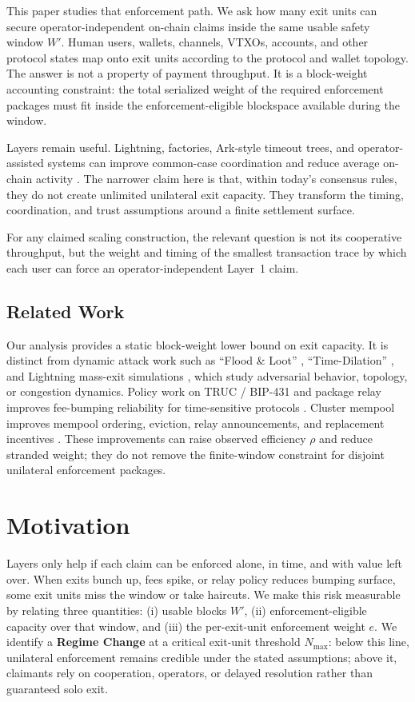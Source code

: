 \documentclass{article}
\theoremstyle{definition}
\begin{document}
This paper studies that enforcement path. We ask how many exit units can secure operator-independent on-chain claims inside the same usable safety window $W'$. Human users, wallets, channels, VTXOs, accounts, and other protocol states map onto exit units according to the protocol and wallet topology. The answer is not a property of payment throughput. It is a block-weight accounting constraint: the total serialized weight of the required enforcement packages must fit inside the enforcement-eligible blockspace available during the window.

Layers remain useful. Lightning, factories, Ark-style timeout trees, and operator-assisted systems can improve common-case coordination and reduce average on-chain activity \cite{factory,ark}. The narrower claim here is that, within today's consensus rules, they do not create unlimited unilateral exit capacity. They transform the timing, coordination, and trust assumptions around a finite settlement surface.

For any claimed scaling construction, the relevant question is not its cooperative throughput, but the weight and timing of the smallest transaction trace by which each user can force an operator-independent Layer~1 claim.

\subsection*{Related Work}
Our analysis provides a static block-weight lower bound on exit capacity. It is distinct from dynamic attack work such as ``Flood \& Loot'' \cite{harrisZohar}, ``Time-Dilation'' \cite{riardNaumenko}, and Lightning mass-exit simulations \cite{sguanci2022}, which study adversarial behavior, topology, or congestion dynamics. Policy work on TRUC / BIP-431 and package relay improves fee-bumping reliability for time-sensitive protocols \cite{bip431,core28,core31,packagepolicy}. Cluster mempool improves mempool ordering, eviction, relay announcements, and replacement incentives \cite{clusterMempool,core31}. These improvements can raise observed efficiency $\rho$ and reduce stranded weight; they do not remove the finite-window constraint for disjoint unilateral enforcement packages.

\section{Motivation}
Layers only help if each claim can be enforced alone, in time, and with value left over. When exits bunch up, fees spike, or relay policy reduces bumping surface, some exit units miss the window or take haircuts. We make this risk measurable by relating three quantities: (i) usable blocks $W'$, (ii) enforcement-eligible capacity over that window, and (iii) the per-exit-unit enforcement weight $e$. We identify a \textbf{Regime Change} at a critical exit-unit threshold $N_{\max}$: below this line, unilateral enforcement remains credible under the stated assumptions; above it, claimants rely on cooperation, operators, or delayed resolution rather than guaranteed solo exit.
\end{document}
